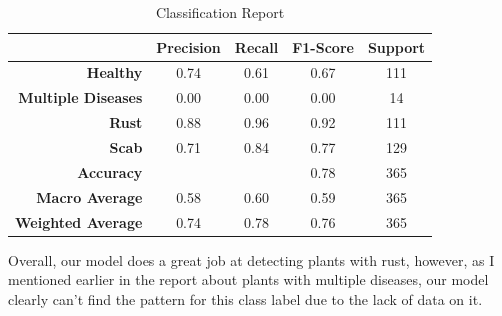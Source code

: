 \documentclass[man,floatsintext]{apa7}
\begin{document}
\begin{singlespace}
\begin{table}[]
\centering
\caption{Classification Report}
\label{fig:Table1}
\begin{tabular}{|r|c|c|c|c|}
\hline
\multicolumn{1}{|l|}{}     & \multicolumn{1}{l|}{\textbf{Precision}} & \multicolumn{1}{l|}{\textbf{Recall}} & \multicolumn{1}{l|}{\textbf{F1-Score}} & \multicolumn{1}{l|}{\textbf{Support}} \\ \hline
\textbf{Healthy}           & 0.74                                    & 0.61                                 & 0.67                                   & 111                                   \\ \hline
\textbf{Multiple Diseases} & 0.00                                    & 0.00                                 & 0.00                                   & 14                                    \\ \hline
\textbf{Rust}              & 0.88                                    & 0.96                                 & 0.92                                   & 111                                   \\ \hline
\textbf{Scab}              & 0.71                                    & 0.84                                 & 0.77                                   & 129                                   \\ \hline
\textbf{Accuracy}          &                                         &                                      & 0.78                                   & 365                                   \\ \hline
\textbf{Macro Average}     & 0.58                                    & 0.60                                 & 0.59                                   & 365                                   \\ \hline
\textbf{Weighted Average}  & 0.74                                    & 0.78                                 & 0.76                                   & 365                                   \\ \hline
\end{tabular}
\end{table}

Overall, our model does a great job at detecting plants with rust, however, as I mentioned earlier in the report about plants with multiple diseases, our model clearly can’t find the pattern for this class label due to the lack of data on it.


\end{singlespace}
\end{document}
